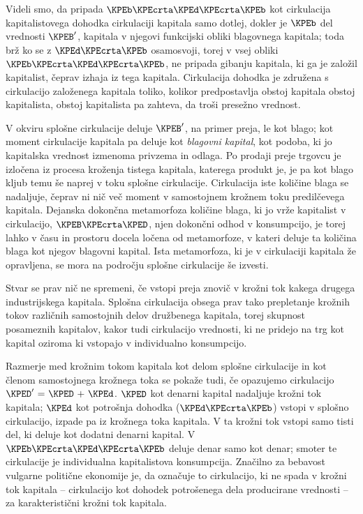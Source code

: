 \documentclass[kapital_02.tex]{subfiles}
\begin{document}
Videli smo, da pripada \( \KPEb \KPEcrta \KPEd \KPEcrta \KPEb \) kot cirkulacija kapitalistovega dohodka cirkulaciji kapitala samo dotlej, dokler je \( \KPEb \) del vrednosti \( \KPEB' \), kapitala v njegovi funkcijski obliki blagovnega kapitala; toda brž ko se z \( \KPEd \KPEcrta \KPEb \) osamosvoji, torej v vsej obliki \( \KPEb \KPEcrta \KPEd \KPEcrta \KPEb \), ne pripada gibanju kapitala, ki ga je založil kapitalist, čeprav izhaja iz tega kapitala. Cirkulacija dohodka je združena s cirkulacijo založenega kapitala toliko, kolikor predpostavlja obstoj kapitala obstoj kapitalista, obstoj kapitalista pa zahteva, da troši presežno vrednost.

V okviru splošne cirkulacije deluje \( \KPEB' \), na primer preja, le kot blago; kot moment cirkulacije kapitala pa deluje kot \emph{blagovni kapital}, kot podoba, ki jo kapitalska vrednost izmenoma privzema in odlaga. Po prodaji preje trgovcu je izločena iz procesa kroženja tistega kapitala, katerega produkt je, je pa kot blago kljub temu še naprej v toku splošne cirkulacije. Cirkulacija iste količine blaga se nadaljuje, čeprav ni nič več moment v samostojnem krožnem toku predilčevega kapitala. Dejanska dokončna metamorfoza količine blaga, ki jo vrže kapitalist v cirkulacijo, \( \KPEB \KPEcrta \KPED \), njen dokončni odhod v konsumpcijo, je torej lahko v času in prostoru docela ločena od metamorfoze, v kateri deluje ta količina blaga kot njegov blagovni kapital. Ista metamorfoza, ki je v cirkulaciji kapitala že opravljena, se mora na področju splošne cirkulacije še izvesti.

Stvar se prav nič ne spremeni, če vstopi preja znovič v krožni tok kakega drugega industrijskega kapitala. Splošna cirkulacija obsega prav tako prepletanje krožnih tokov različnih samostojnih delov družbenega kapitala, torej skupnost posameznih kapitalov, kakor tudi cirkulacijo vrednosti, ki ne \KPEstran pridejo na trg kot kapital oziroma ki vstopajo v individualno konsumpcijo.

Razmerje med krožnim tokom kapitala kot delom splošne cirkulacije in kot členom samostojnega krožnega toka se pokaže tudi, če opazujemo cirkulacijo \( \KPED' \textrm{ = } \KPED \textrm{ + } \KPEd \). \( \KPED \) kot denarni kapital nadaljuje krožni tok kapitala; \( \KPEd \) kot potrošnja dohodka (\( \KPEd \KPEcrta \KPEb \)) vstopi v splošno cirkulacijo, izpade pa iz krožnega toka kapitala. V ta krožni tok vstopi samo tisti del, ki deluje kot dodatni denarni kapital. V \( \KPEb \KPEcrta \KPEd \KPEcrta \KPEb \) deluje denar samo kot denar; smoter te cirkulacije je individualna kapitalistova konsumpcija. Značilno za bebavost vulgarne politične ekonomije je, da označuje to cirkulacijo, ki ne spada v krožni tok kapitala -- cirkulacijo kot dohodek potrošenega dela producirane vrednosti -- za karakteristični krožni tok kapitala.
\end{document}
